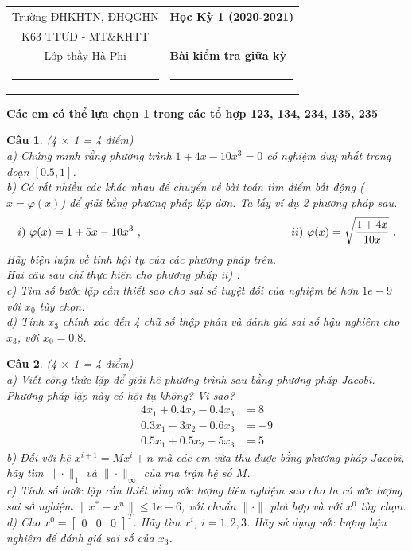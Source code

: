 \documentclass[11pt]{article}
\newtheorem{bt}{Câu}
\newcommand{\m}[1]{
	\begin{bmatrix}
		#1
	\end{bmatrix}
}
\begin{document}
\begin{tabular*}
{\linewidth}{c>{\centering\hspace{0pt}} p{}}
Trường ĐHKHTN, ĐHQGHN & {\bf Học Kỳ 1 (2020-2021)}
\tabularnewline
K63 TTƯD - MT\&KHTT \\ Lớp thầy Hà Phi & {\bf Bài kiểm tra giữa kỳ}
\tabularnewline
\rule{1in}{1pt}  \small  & \rule{2in}{1pt} %
\tabularnewline

\end{tabular*}
%

\begin{center}	
\textbf{Các em có thể lựa chọn 1 trong các tổ hợp 123, 134, 234, 135, 235}
\end{center}

\begin{bt}(4 $\times$ 1 = 4 điểm) \\
a)	Chứng minh rằng phương trình $1+4x-10x^3=0$ có nghiệm duy nhất trong đoạn $[0.5, 1]$. \\
b)	Có rất nhiều các khác nhau để chuyển về bài toán tìm điểm bất động ($x=\varphi(x)$) để giải bằng phương pháp lặp đơn. Ta lấy ví dụ 2 phương pháp sau.
%
\[
i) \ \varphi(x) = 1+5x-10x^3 \ , \hskip 4cm \qquad ii) \ \varphi(x) = \sqrt{\dfrac{1+4x}{10x}} \ .
\]
%
Hãy biện luận về tính hội tụ của các phương pháp trên. \\
Hai câu sau chỉ thực hiện cho phương pháp ii) . \\
c) Tìm số bước lặp cần thiết sao cho sai số tuyệt đối của nghiệm bé hơn $1e-9$ với $x_0$ tùy chọn. \\
d) Tính $x_3$ chính xác đến 4 chữ số thập phân và đánh giá sai số hậu nghiệm cho $x_3$, với $x_0 = 0.8$. 
\end{bt}


\begin{bt}(4 $\times$ 1 = 4 điểm) \\
	a) Viết công thức lặp để giải hệ phương trình sau bằng phương pháp Jacobi. Phương pháp lặp này có hội tụ không? Vì sao?
	\begin{align*}
	4 x_1 + 0.4 x_2 - 0.4 x_3 &= 8 \\
	0.3 x_1 - 3 x_2 - 0.6 x_3 &= -9 \\
	0.5 x_1 + 0.5 x_2 - 5 x_3 &= 5 
	\end{align*}
	b) Đối với hệ $x^{i+1} = M x^{i} + n$ mà các em vừa thu được bằng phương pháp Jacobi, hãy tìm $\|\cdot\|_1$ và $\|\cdot\|_{\infty}$ của ma trận hệ số $M$. \\
	c) Tính số bước lặp cần thiết bằng ước lượng tiên nghiệm sao cho ta có ước lượng sai số nghiệm $\|x^*-x^n\| \leq 1e-6$, với chuẩn $\|\cdot\|$ phù hợp và với $x^0$ tùy chọn. \\
	d) Cho $x^0 = \m{0 & 0 & 0}^T$. Hãy tìm $x^i$, $i=1,2,3$. Hãy sử dụng ước lượng hậu nghiệm để đánh giá sai số của $x_3$.
\end{bt}
\end{document}
